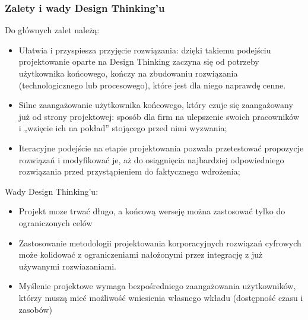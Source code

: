 \documentclass[a4paper,titleauthor]{mwart}
\begin{document}
	\subsubsection{Zalety i wady Design Thinking'u}
	Do głównych zalet należą:\newline
	\begin{itemize}
		\item Ułatwia i przyspiesza przyjęcie rozwiązania: dzięki takiemu podejściu projektowanie oparte na Design Thinking zaczyna się od potrzeby użytkownika końcowego, kończy na zbudowaniu rozwiązania (technologicznego lub procesowego), które jest dla niego naprawdę cenne.
		\item Silne zaangażowanie użytkownika końcowego, który czuje się zaangażowany już od strony projektowej: sposób dla firm na ulepszenie swoich pracowników i „wzięcie ich na pokład” stojącego przed nimi wyzwania;
		\item Iteracyjne podejście na etapie projektowania pozwala przetestować propozycje rozwiązań i modyfikować je, aż do osiągnięcia najbardziej odpowiedniego rozwiązania przed przystąpieniem do faktycznego wdrożenia;
	\end{itemize}
	\vspace{0,5cm}
	\hspace{0,5cm}Wady Design Thinking'u:\newline
	\begin{itemize}
		\item Projekt moze trwać długo, a końcową werseję można zastosować tylko do ograniczonych celów
		\item Zastosowanie metodologii projektowania korporacyjnych rozwiązań cyfrowych może kolidować z ograniczeniami nałożonymi przez integrację z już używanymi rozwiazaniami.
		\item Myślenie projektowe wymaga bezpośredniego zaangażowania użytkowników, którzy muszą mieć możliwość wniesienia własnego wkładu (dostępność czasu i zasobów)
	\end{itemize}
	
	
\end{document}
